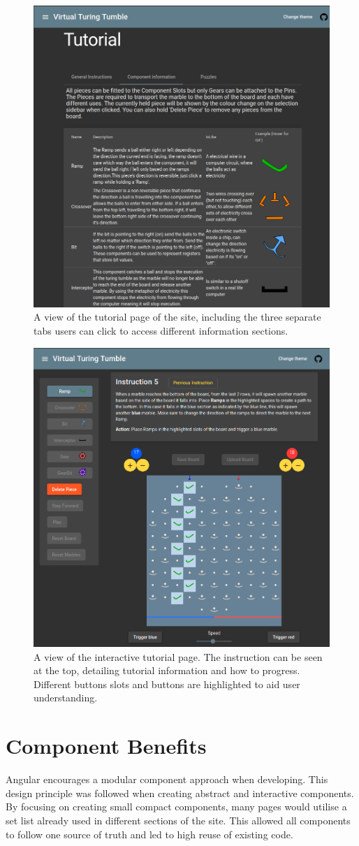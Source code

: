 \documentclass{l4proj}
\begin{document}
\begin{figure}
    \centering
    \includegraphics[width=0.65\linewidth]{images/tutorial.png}
    \caption{A view of the tutorial page of the site, including the three separate tabs users can click to access different information sections.}
    \label{fig:tutorial}
\end{figure}

\begin{figure}
    \centering
    \includegraphics[width=0.65\linewidth]{images/interactiveTut.png}
    \caption{A view of the interactive tutorial page. The instruction can be seen at the top, detailing tutorial information and how to progress. Different buttons slots and buttons are highlighted to aid user understanding.}
    \label{fig:inTutorial}
\end{figure}


 

\section{Component Benefits}
Angular encourages a modular component approach when developing. This design principle was followed when creating abstract and interactive components. By focusing on creating small compact components, many pages would utilise a set list already used in different sections of the site. This allowed all components to follow one source of truth and led to high reuse of existing code. 
\end{document}
